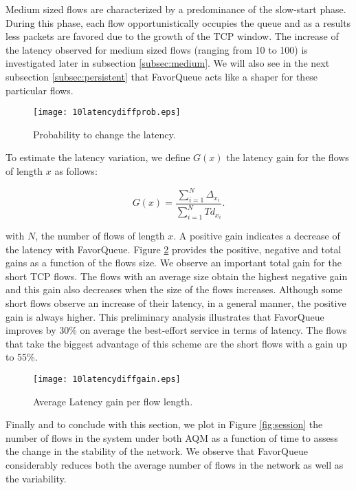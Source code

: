 \documentclass{elsart}
\begin{document}
Medium sized flows are characterized by a predominance of the slow-start phase. During this phase, each flow opportunistically occupies the queue and as a results less packets are favored due to the growth of the TCP window. The increase of the latency observed for medium sized flows (ranging from 10 to 100) is investigated later in subsection \ref{subsec:medium}. We will also see in the next subsection \ref{subsec:persistent} that FavorQueue acts like a shaper for these particular flows.

\begin{figure}[ht]
\begin{center}
\texttt{[image: 10latencydiffprob.eps]}
\end{center}
\caption{Probability to change the latency.}
\label{fig:diffprob}
\end{figure}

To estimate the latency variation, we define $G(x)$ the latency gain for the flows of length $x$ as follows:

\begin{equation}
G(x) = \frac{\sum_{i=1}^{N} \Delta_{x_{i}} }{\sum_{i=1}^{N}Td_{x_{i}}}\textrm{.}
\end{equation}

with $N$, the number of flows of length $x$. A positive gain indicates a decrease of the latency with FavorQueue. 
Figure \ref{fig:diffgain} provides the positive, negative and total gains as a function of the flows size. We observe an important total gain for the short TCP flows. 
The flows with an average size obtain the highest negative gain and this gain also decreases when the size of the flows increases.
Although some short flows observe an increase of their latency, in a general manner, the positive gain is always higher. 
This preliminary analysis illustrates that FavorQueue improves by 30\% on average the best-effort service in terms of latency. The flows that take the biggest advantage of this scheme are the short flows with a gain up to 55\%.

\begin{figure}[ht]
\begin{center}
\texttt{[image: 10latencydiffgain.eps]}
\end{center}
\caption{Average Latency gain per flow length.}
\label{fig:diffgain}
\end{figure}

Finally and to conclude with this section, we plot in Figure \ref{fig:session} the number of flows in the system under both AQM as a function of time 
to assess the change in the stability of the network. 
We observe that FavorQueue considerably reduces both the average number of flows in the network as well as the variability. 
\end{document}
